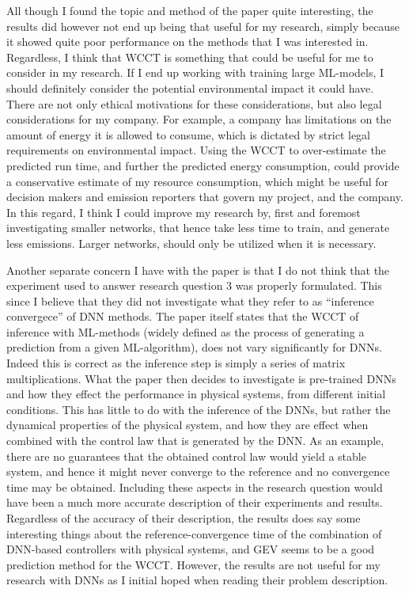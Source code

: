 \documentclass[a4paper,11pt]{article}
\begin{document}
All though I found the topic and method of the paper quite interesting, the results did however not end up being that useful for my research, simply because it showed quite poor performance on the methods that I was interested in. Regardless, I think that WCCT is something that could be useful for me to consider in my research. If I end up working with training large ML-models, I should definitely consider the potential environmental impact it could have. There are not only ethical motivations for these considerations, but also legal considerations for my company. For example, a company has limitations on the amount of energy it is allowed to consume, which is dictated by strict legal requirements on environmental impact. Using the WCCT to over-estimate the predicted run time, and further the predicted energy consumption, could provide a conservative estimate of my resource consumption, which might be useful for decision makers and emission reporters that govern my project, and the company. In this regard, I think I could improve my research by, first and foremost investigating smaller networks, that hence take less time to train, and generate less emissions. Larger networks, should only be utilized when it is necessary.

Another separate concern I have with the paper is that I do not think that the experiment used to answer research question 3 was properly formulated. This since I believe that they did not investigate what they refer to as ``inference convergece'' of DNN methods. The paper itself states that the WCCT of inference with ML-methods (widely defined as the process of generating a prediction from a given ML-algorithm), does not vary significantly for DNNs. Indeed this is correct as the inference step is simply a series of matrix multiplications. What the paper then decides to investigate is pre-trained DNNs and how they effect the performance in physical systems, from different initial conditions. This has little to do with the inference of the DNNs, but rather the dynamical properties of the physical system, and how they are effect when combined with the control law that is generated by the DNN. As an example, there are no guarantees that the obtained control law would yield a stable system, and hence it might never converge to the reference and no convergence time may be obtained. Including these aspects in the research question would have been a much more accurate description of their experiments and results. Regardless of the accuracy of their description, the results does say some interesting things about the reference-convergence time of the combination of DNN-based controllers with physical systems, and GEV seems to be a good prediction method for the WCCT. However, the results are not useful for my research with DNNs as I initial hoped when reading their problem description.
\end{document}
